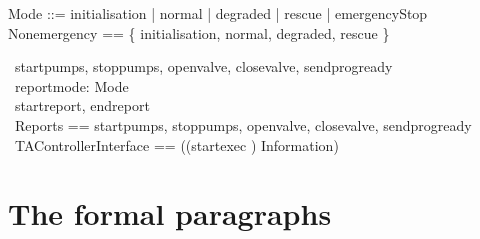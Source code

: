 \documentclass{report} %
\begin{document}
\begin{zed}
  Mode ::= initialisation | normal | degraded | rescue | emergencyStop \\
  Nonemergency == \{ initialisation, normal, degraded, rescue \}
\end{zed}

\begin{circus}
    \circchannel\ startpumps, stoppumps, openvalve, closevalve, sendprogready \\
    \circchannel\ reportmode: Mode \\
    \circchannel\ startreport, endreport \\
    \circchannelset\ Reports ==  \lchanset startpumps, stoppumps, openvalve, closevalve, sendprogready \rchanset \\
    \circchannelset\ TAControllerInterface ==
    ((\lchanset startexec \rchanset) \union Information)
\end{circus}
\section{The formal paragraphs}
\end{document}
